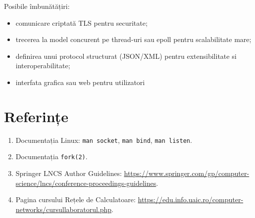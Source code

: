 \documentclass[runningheads]{llncs}
\begin{document}
Posibile îmbunătățiri:
\begin{itemize}[noitemsep, topsep=0pt]
    \item comunicare criptată TLS pentru securitate;
    \item trecerea la model concurent pe thread-uri sau epoll pentru scalabilitate mare;
    \item definirea unui protocol structurat (JSON/XML) pentru extensibilitate si interoperabilitate;
    \item interfata grafica sau web pentru utilizatori
\end{itemize}

\vspace{10mm}

\section*{Referințe}

\begin{enumerate}[noitemsep, topsep=0pt]
    \item Documentația Linux: \texttt{man socket}, \texttt{man bind}, \texttt{man listen}.
    \item Documentația \texttt{fork(2)}.
    \item Springer LNCS Author Guidelines: \url{https://www.springer.com/gp/computer-science/lncs/conference-proceedings-guidelines}.
    \item Pagina cursului Rețele de Calculatoare: \url{https://edu.info.uaic.ro/computer-networks/cursullaboratorul.php}.
\end{enumerate}
\end{document}
